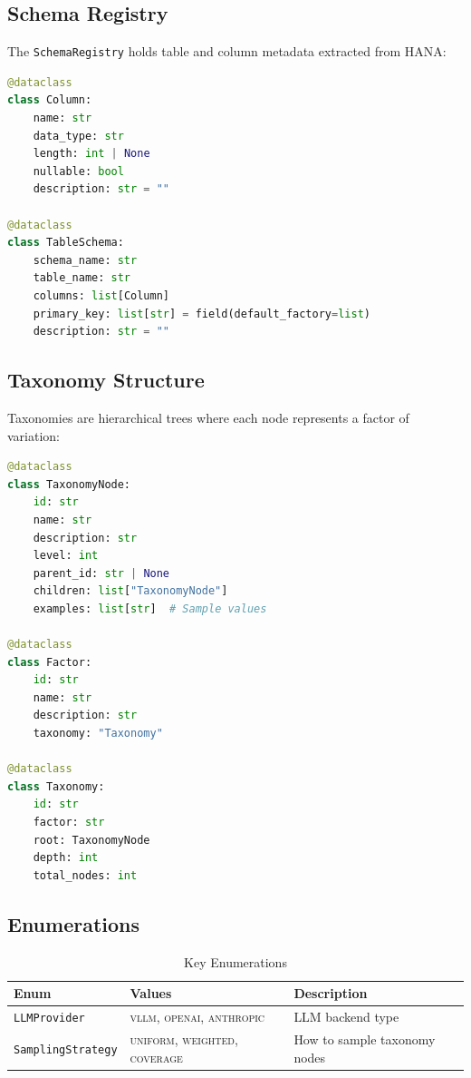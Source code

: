 \subsection{Schema Registry}

The \texttt{SchemaRegistry} holds table and column metadata extracted from HANA:

\begin{lstlisting}[language=Python,caption={Schema registry structures (schema\_registry.py)}]
@dataclass
class Column:
    name: str
    data_type: str
    length: int | None
    nullable: bool
    description: str = ""

@dataclass
class TableSchema:
    schema_name: str
    table_name: str
    columns: list[Column]
    primary_key: list[str] = field(default_factory=list)
    description: str = ""
\end{lstlisting}

\subsection{Taxonomy Structure}

Taxonomies are hierarchical trees where each node represents a factor of variation:

\begin{lstlisting}[language=Python,caption={Taxonomy structures (simula\_taxonomy\_builder.py)}]
@dataclass
class TaxonomyNode:
    id: str
    name: str
    description: str
    level: int
    parent_id: str | None
    children: list["TaxonomyNode"]
    examples: list[str]  # Sample values

@dataclass
class Factor:
    id: str
    name: str
    description: str
    taxonomy: "Taxonomy"

@dataclass
class Taxonomy:
    id: str
    factor: str
    root: TaxonomyNode
    depth: int
    total_nodes: int
\end{lstlisting}

\subsection{Enumerations}

\begin{table}[H]
\centering
\caption{Key Enumerations}
\label{tab:enums}
\begin{tabular}{lll}
\toprule
\textbf{Enum} & \textbf{Values} & \textbf{Description} \\
\midrule
\texttt{LLMProvider} & \textsc{vllm}, \textsc{openai}, \textsc{anthropic} & LLM backend type \\
\texttt{SamplingStrategy} & \textsc{uniform}, \textsc{weighted}, \textsc{coverage} & How to sample taxonomy nodes \\
\bottomrule
\end{tabular}
\end{table}

